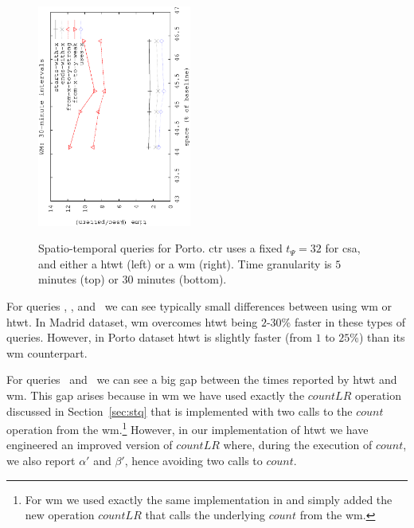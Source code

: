 \begin{figure}[!ht]
\begin{center}
			{\includegraphics[angle=-90,width=0.45\textwidth]{figures_synt/porto_wm30.eps}}
			
			
			
		\end{center}
		\vspace{-0.3cm}
		\caption{Spatio-temporal queries for Porto. \acrlong{ctr} uses a fixed $t_{\Psi}=32$ for \acrlong{csa}, 
			and either a \acrlong{htwt} (left) or a \acrlong{wm} (right). 
			Time granularity is $5$ minutes (top) or $30$ minutes (bottom). 
		}
		\label{fig:portost}
	\end{figure}





	For queries \Tswx, \Tewx, and \Tux\ we can see typically small differences between using \gls{wm} or \gls{htwt}. In 
	Madrid dataset, \gls{wm} overcomes \gls{htwt} being $2$-$30$\% faster in these types of queries. 
	However, in Porto dataset \gls{htwt} is slightly 
	faster (from $1$ to $25$\%) than its \gls{wm} counterpart.

	For queries \Tfxtys\ and \Tfxtyw\ we can see a big gap between the times reported by \gls{htwt} and \gls{wm}.
	This gap arises because in \gls{wm} we have used exactly the $countLR$ operation discussed in Section~\ref{sec:stq}
	that is implemented with two calls to the $count$ operation from the \gls{wm}.\footnote{For \gls{wm} we used exactly the same 
		implementation in \cite{CNO15} and simply added the new operation $countLR$ that calls the underlying $count$ from the
		\gls{wm}. }  
	However, in our implementation of
	\gls{htwt} we have engineered an improved version of $countLR$ where, during the execution of $count$, we also report
	$\alpha'$ and  $\beta'$, hence avoiding two calls to $count$.
	 
